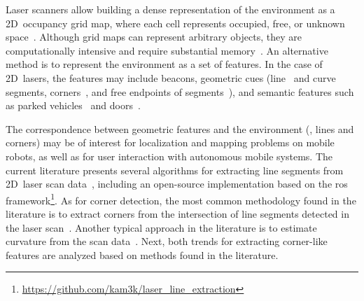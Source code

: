 Laser scanners allow building a dense representation of the environment as
a 2D~occupancy grid map, where each cell represents occupied, free,
or unknown space~\cite{grisetti:tro:2007}.
Although grid maps can represent arbitrary objects, they are computationally
intensive and require substantial memory~\cite{wurm:ras:2010}.
An alternative method is to represent the environment as a set of features.
In the case of 2D~lasers, the features may include
beacons\cite{sobreira:icarsc:2015}, geometric cues
(line~\cite{castellanos:mfi:1996,roumeliotis-bekey:iros:2000,mohamed:isprs-arxiv:2016,liu:sensors:2023,nunez:icra:2006,vazquez-martin:sensors:2009,feng:aici:2009,pfister:icra:2003,gao:ijars:2018}
and curve~\cite{falomir:prl:2013,nunez:icra:2006,vazquez-martin:sensors:2009,feng:aici:2009} segments,
corners~\cite{castellanos:mfi:1996,roumeliotis-bekey:iros:2000,jung:tits:2008,falomir:prl:2013,mohamed:isprs-arxiv:2016,lin:yac:2017,liu:electronics:2022,liu:sensors:2023,nunez:icra:2006,vazquez-martin:sensors:2009,feng:aici:2009,certad:andescon:2012},
and free endpoints of segments~\cite{castellanos:mfi:1996,liu:electronics:2022,vazquez-martin:sensors:2009,certad:andescon:2012}),
and semantic features such as
parked vehicles~\cite{jung:tits:2008,qu:robio:2018}
and doors~\cite{roumeliotis-bekey:iros:2000}.

The correspondence between geometric features and the environment
(\eg, lines and corners) may be of interest for localization and mapping
problems on mobile robots, as well as for user interaction
with autonomous mobile systems.
The current literature presents several algorithms for extracting
line segments from 2D~laser scan
data~\cite{castellanos:mfi:1996,roumeliotis-bekey:iros:2000,mohamed:isprs-arxiv:2016,liu:sensors:2023,nunez:icra:2006,vazquez-martin:sensors:2009,feng:aici:2009,pfister:icra:2003,gao:ijars:2018},
including an open-source implementation based on the \gls{ros}~\cite{ros}
framework\footnote{\label{note:features:line-feature-ros}\url{https://github.com/kam3k/laser_line_extraction}}.
As for corner detection, the most common methodology found in the literature
is to extract corners from the intersection of line segments detected in the
laser scan~\cite{castellanos:mfi:1996,roumeliotis-bekey:iros:2000,jung:tits:2008,falomir:prl:2013,fernandez-moral:ijrr:2015,mohamed:isprs-arxiv:2016,zhao:icsess:2016,lin:yac:2017,qu:robio:2018,liu:electronics:2022,liu:sensors:2023}.
Another typical approach in the literature is to estimate curvature from the
scan data~\cite{nunez:icra:2006,vazquez-martin:sensors:2009,feng:aici:2009,certad:andescon:2012}.
Next, both trends for extracting corner-like features are analyzed
based on methods found in the literature.

